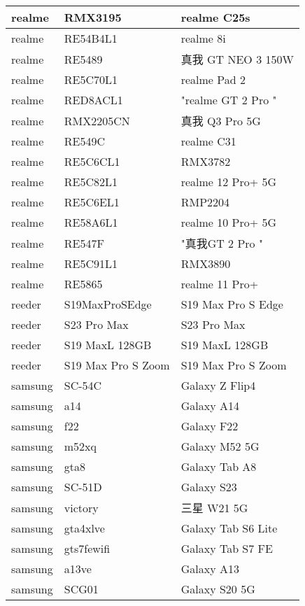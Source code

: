 \begin{tabularx}{\linewidth}{|l|X|X|}
        realme & RMX3195 & realme C25s \\ \hline
        realme & RE54B4L1 & realme 8i \\ \hline
        realme & RE5489 & 真我 GT NEO  3  150W \\ \hline
        realme & RE5C70L1 & realme Pad 2 \\ \hline
        realme & RED8ACL1 & "realme GT 2 Pro	" \\ \hline
        realme & RMX2205CN & 真我 Q3 Pro 5G \\ \hline
        realme & RE549C & realme C31 \\ \hline
        realme & RE5C6CL1 & RMX3782 \\ \hline
        realme & RE5C82L1 & realme 12 Pro+ 5G \\ \hline
        realme & RE5C6EL1 & RMP2204 \\ \hline
        realme & RE58A6L1 & realme 10 Pro+ 5G \\ \hline
        realme & RE547F & "真我GT 2 Pro	" \\ \hline
        realme & RE5C91L1 & RMX3890 \\ \hline
        realme & RE5865 & realme 11 Pro+ \\ \hline
        reeder & S19MaxProSEdge & S19 Max Pro S Edge \\ \hline
        reeder & S23 Pro Max & S23 Pro Max \\ \hline
        reeder & S19 MaxL 128GB & S19 MaxL 128GB \\ \hline
        reeder & S19 Max Pro S Zoom & S19 Max Pro S Zoom \\ \hline
        samsung & SC-54C & Galaxy Z Flip4 \\ \hline
        samsung & a14 & Galaxy A14 \\ \hline
        samsung & f22 & Galaxy F22 \\ \hline
        samsung & m52xq & Galaxy M52 5G \\ \hline
        samsung & gta8 & Galaxy Tab A8 \\ \hline
        samsung & SC-51D & Galaxy S23 \\ \hline
        samsung & victory & 三星 W21 5G \\ \hline
        samsung & gta4xlve & Galaxy Tab S6 Lite \\ \hline
        samsung & gts7fewifi & Galaxy Tab S7 FE \\ \hline
        samsung & a13ve & Galaxy A13 \\ \hline
        samsung & SCG01 & Galaxy S20 5G \\ \hline

\end{tabularx}
